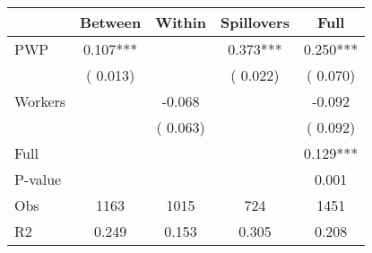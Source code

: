 
\begin{tabular}{l*{4}{c}}\hline&\multicolumn{1}{c}{Between}&\multicolumn{1}{c}{Within}&\multicolumn{1}{c}{Spillovers}&\multicolumn{1}{c}{Full}\\ \hline
 PWP           &              0.107***      &                                               &        0.373*** &         0.250***                            \\ 
                               &        (       0.013)           &                                       &       (       0.022)     &      (       0.070)                                           \\ 
 Workers       &                                               &       -0.068    &                                &            -0.092                            \\ 
                               &                                               & (       0.063)                  &                                        &      (       0.092)                                           \\ 
\hline                                                                                                                                                                                                                                            
 Full                  &                                               &                                               &                                        &             0.129***                                     \\ 
 P-value               &                                               &                                               &                                        &             0.001                                           \\ 
 Obs                   &               1163               &       1015                       &       724                &              1451                                               \\ 
 R2                    &                      0.249              &              0.153                      &              0.305               &                     0.208                                              \\ 
\hline \end{tabular}                                                                                                                                                                                                              